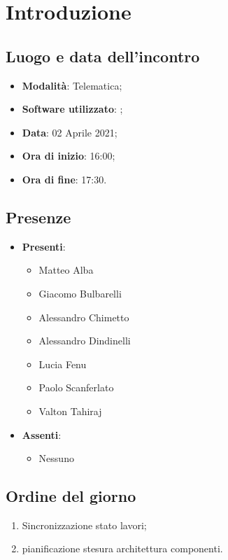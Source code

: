 \documentclass[]{article}
\begin{document}
	

	\newpage


		\section{Introduzione}
		\subsection{Luogo e data dell'incontro}
		\begin{itemize}
			\item \textbf{Modalità}: Telematica;
			\item \textbf{Software utilizzato}: ;
			\item \textbf{Data}: 02 Aprile 2021;
			\item \textbf{Ora di inizio}: 16:00;
			\item \textbf{Ora di fine}: 17:30.
		\end{itemize}

		\subsection{Presenze}
		\begin{itemize}
			\item \textbf{Presenti}:
			\begin{itemize}
				\item Matteo Alba
				\item Giacomo Bulbarelli
				\item Alessandro Chimetto
				\item Alessandro Dindinelli
				\item Lucia Fenu
				\item Paolo Scanferlato
				\item Valton Tahiraj
			\end{itemize}
			\item \textbf{Assenti}:
			\begin{itemize}
				\item Nessuno
			\end{itemize}
		\end{itemize}


		\subsection{Ordine del giorno}
		\begin{enumerate}
			\item Sincronizzazione stato lavori;
			\item pianificazione stesura architettura componenti.
		\end{enumerate}
\end{document}
